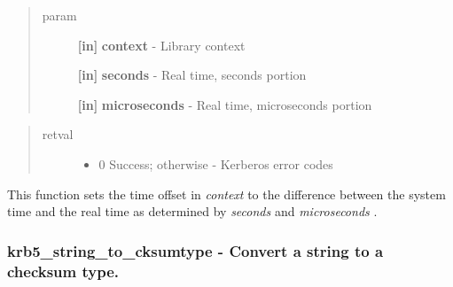 \documentclass[letterpaper,10pt,english]{sphinxmanual}
\begin{document}
\begin{quote}\begin{description}
\item[{param}] \leavevmode
\textbf{{[}in{]}} \textbf{context} - Library context

\textbf{{[}in{]}} \textbf{seconds} - Real time, seconds portion

\textbf{{[}in{]}} \textbf{microseconds} - Real time, microseconds portion

\end{description}\end{quote}
\begin{quote}\begin{description}
\item[{retval}] \leavevmode\begin{itemize}
\item {} 
0   Success; otherwise - Kerberos error codes

\end{itemize}

\end{description}\end{quote}

This function sets the time offset in \emph{context} to the difference between the system time and the real time as determined by \emph{seconds} and \emph{microseconds} .


\subsubsection{krb5\_string\_to\_cksumtype -  Convert a string to a checksum type.}
\label{appdev/refs/api/krb5_string_to_cksumtype:krb5-string-to-cksumtype-convert-a-string-to-a-checksum-type}\label{appdev/refs/api/krb5_string_to_cksumtype::doc}

\begin{fulllineitems}
\label{appdev/refs/api/krb5_string_to_cksumtype:krb5_string_to_cksumtype}
\end{fulllineitems}
\end{document}
